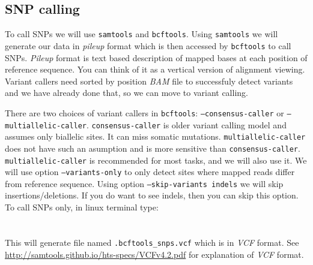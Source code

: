 \subsection{SNP calling}

To call SNPs we will use \texttt{samtools} and \texttt{bcftools}.
Using \texttt{samtools} we will generate our data in \textit{pileup} format which
is then accessed by \texttt{bcftools} to call SNPs.
\textit{Pileup} format is text based description of mapped bases at each position of reference sequence.
You can think of it as a vertical version of alignment viewing.
Variant callers need sorted by position \textit{BAM} file to successfuly detect variants
and we have already done that, so we can move to variant calling.

There are two choices of variant callers in \texttt{bcftools}:
\texttt{--consensus-caller} or \texttt{--multiallelic-caller}. \texttt{consensus-caller} is
older variant calling model and assumes only biallelic sites. It can miss somatic mutations.
\texttt{multiallelic-caller} does not have such an asumption and is more sensitive than \texttt{consensus-caller}.
\texttt{multiallelic-caller} is recommended for most tasks, and we will also use it. 
We will use option \texttt{--variants-only} to only detect sites where mapped reads differ from reference sequence.
Using option \texttt{--skip-variants indels} we will skip insertions/deletions. If you do want to
see indels, then you can skip this option. To call SNPs only, in linux terminal type:\\~\\
\\

This will generate file named \texttt{\mapReads.bcftools\_snps.vcf} which is in \textit{VCF} format.
See \url{http://samtools.github.io/hts-specs/VCFv4.2.pdf} for explanation of \textit{VCF} format.
